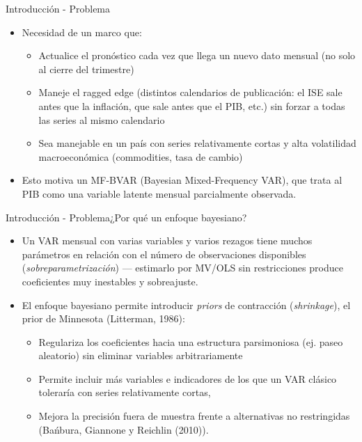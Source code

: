 \documentclass{beamer}
\begin{document}
\begin{frame}{Introducción - Problema}{}
\begin{itemize}\justifying
	\item Necesidad de un marco que:
	\begin{itemize}
		\item Actualice el pronóstico cada vez que llega un nuevo dato mensual (no solo al cierre del trimestre)
		\item Maneje el ragged edge (distintos calendarios de publicación: el ISE sale antes que la inflación, que sale antes que el PIB, etc.) sin forzar a todas las series al mismo calendario
		\item Sea manejable en un país con series relativamente cortas y alta volatilidad macroeconómica (commodities, tasa de cambio)
	\end{itemize}
	\item Esto motiva un MF-BVAR (Bayesian Mixed-Frequency VAR), que trata al PIB como una variable latente mensual parcialmente observada.
\end{itemize}
\end{frame}

\begin{frame}{Introducción - Problema}{¿Por qué un enfoque bayesiano?}
\begin{itemize}\justifying
	\item Un VAR mensual con varias variables y varios rezagos tiene muchos parámetros en relación con el número de observaciones disponibles (\textit{sobreparametrización}) — estimarlo por MV/OLS sin restricciones produce coeficientes muy inestables y sobreajuste. \pause
	\item El enfoque bayesiano permite introducir \textit{priors} de contracción (\textit{shrinkage}), el prior de Minnesota (Litterman, 1986):
	
	\begin{itemize}\justifying
		\item Regulariza los coeficientes hacia una estructura parsimoniosa (ej. paseo aleatorio) sin eliminar variables arbitrariamente
		\item Permite incluir más variables e indicadores de los que un VAR clásico toleraría con series relativamente cortas,
		\item Mejora la precisión fuera de muestra frente a alternativas no restringidas (Bańbura, Giannone y Reichlin (2010)).
	\end{itemize}

\end{itemize}
\end{frame}
\end{document}
